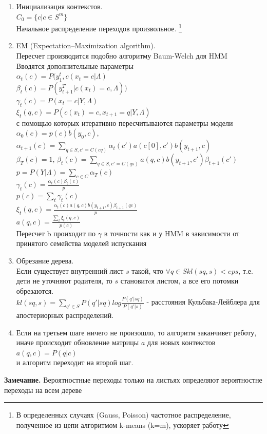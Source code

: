 \documentclass[10pt,a4paper]{article}
\begin{document}
\begin{enumerate}
\item Инициализация контекстов.
\\
$ C_{0} = \{c| c\in S^{m}\}$
\\
Начальное распределение переходов произвольное.
\footnote{В определенных случаях (Gauss, Poisson) частотное распределение, полученное из цепи алгоритмом k-means (k=m), ускоряет работу}
\\
\item EM (Expectation–Maximization algorithm).
\\
Пересчет производится подобно алгоритму Baum-Welch для HMM
\\
Вводятся дополнительные параметры
\\
$ \alpha_{t}(c) = P(y_{1}^{t}, c(x_{t}=c| \Lambda)$
\\
$ \beta_{t}(c) = P(y_{t+1}^{T}| c(x_{t})=c, \Lambda))$
\\
$ \gamma_{t}(c) = P(x_{t}=c|Y,\Lambda) $
\\
$ \xi_{t}(q,c) = P(c(x_{t})=c, x_{t+1} = q| Y, \Lambda)$
\\
с помощью которых итеративно пересчитываются параметры модели
\\
$ \alpha_{0}(c) = p(c)b(y_{0},c)$, 
$ \alpha_{t+1}(c) = \sum_{q \in S, c'=C(cq)}{\alpha_{t}(c')a(c[0],c')b(y_{t+1},c)}$
\\
$ \beta_{T}(c) = 1$, 
$ \beta_{t}(c) = \sum_{q \in S, c'=C(qs)}{a(q,c)b(y_{t+1}, c')\beta_{t+1}(c')}$
\\
$p = P(Y|\Lambda) = \sum_{c \in C}\alpha_{T}(c)$
\\ 
$ \gamma_{t}(c) = \frac{\alpha_{t}(c)\beta_{t}(c)}{p}$
\\
$p(c) = \sum_{t}\gamma_{t}(c)$
\\
$ \xi_{t}(q,c) = \frac{\alpha_{t}(c)a(q,c)b(y_{t+1},c)\beta_{t+1}(qc)}{p} $
\\
$ a(q, c) = \frac{\sum_{t}\xi_{t}(q,c)}{p(c)}$
\\
Пересчет b проиходит по $ \gamma $ в точности как и у HMM в зависимости от принятого семейства моделей испускания
\\
\item Обрезание дерева.
\\
Если существует внутренний лист $ s $ такой, что $ \forall q \in S kl(sq, s) < eps $, т.е. дети не уточняют родителя, то $ s $ становитcя листом, а все его потомки обрезаются.
\\
$kl(sq, s) = \sum_{q' \in S} P(q'|sq) log\frac{P(q'|sq)}{P(q'|s)}$ - расстояния Кульбака-Лейблера для апостериорных распределений.
\\
\item Если на третьем шаге ничего не произошло, то алгоритм заканчивет реботу, 
иначе происходит обновление матрицы $ a $ для новых контекстов
\\
$ a(q, c) = P(q| c)$
\\
и алгоритм переходит на второй шаг.
\\
\end{enumerate}
\textbf{Замечание.}  Вероятностные переходы только на листьях определяют вероятностне переходы на всем дереве
\end{document}
